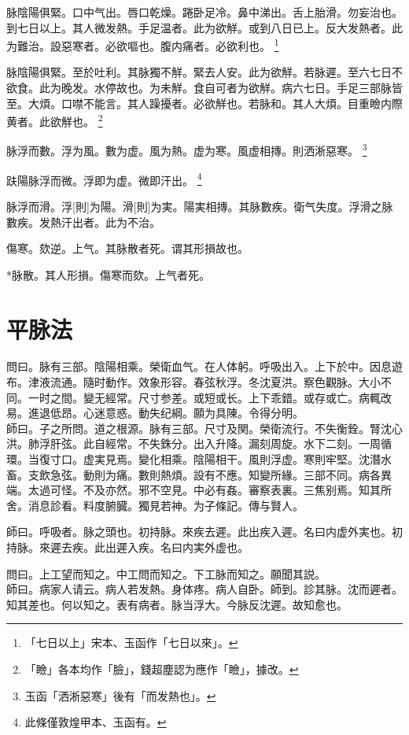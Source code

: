 \documentclass[12pt,oneside,UTF8,b5paper]{ctexbook}她她她她她她她
\begin{document}
脉陰陽俱緊。口中气出。唇口乾燥。踡卧足冷。鼻中涕出。舌上胎滑。勿妄治也。到七日以上。其人微发熱。手足温者。此为欲觧。或到八日已上。反大发熱者。此为難治。設惡寒者。必欲嘔也。腹内痛者。必欲利也。
	\footnote{「七日以上」宋本、玉函作「七日以來」。}

脉陰陽俱緊。至於吐利。其脉獨不觧。緊去人安。此为欲觧。若脉遲。至六七日不欲食。此为晚发。水停故也。为未觧。食自可者为欲觧。病六七日。手足三部脉皆至。大煩。口噤不能言。其人躁擾者。必欲觧也。若脉和。其人大煩。目重瞼内際黄者。此欲觧也。
	\footnote{「瞼」各本均作「臉」，錢超塵認为應作「瞼」，據改。}

脉浮而數。浮为風。數为虚。風为熱。虚为寒。風虚相摶。則洒淅惡寒。
	\footnote{玉函「洒淅惡寒」後有「而发熱也」。}

趺陽脉浮而微。浮即为虚。微即汗出。
	\footnote{此條僅敦煌甲本、玉函有。}

脉浮而滑。浮[則]为陽。滑[則]为実。陽実相摶。其脉數疾。衛气失度。浮滑之脉數疾。发熱汗出者。此为不治。

傷寒。欬逆。上气。其脉散者死。谓其形損故也。

*脉散。其人形損。傷寒而欬。上气者死。

\chapter{平脉法}

問曰。脉有三部。陰陽相乘。榮衛血气。在人体躬。呼吸出入。上下於中。因息遊布。津液流通。隨时動作。效象形容。春弦秋浮。冬沈夏洪。察色觀脉。大小不同。一时之間。變无經常。尺寸参差。或短或长。上下乖錯。或存或亡。病輒改易。進退低昂。心迷意惑。動失纪綱。願为具陳。令得分明。\\
師曰。子之所問。道之根源。脉有三部。尺寸及関。榮衛流行。不失衡銓。腎沈心洪。肺浮肝弦。此自經常。不失銖分。出入升降。漏刻周旋。水下二刻。一周循環。当復寸口。虚実見焉。變化相乘。陰陽相干。風則浮虚。寒則牢堅。沈潛水畜。支飲急弦。動則为痛。數則熱煩。設有不應。知變所緣。三部不同。病各異端。太過可怪。不及亦然。邪不空見。中必有姦。審察表裏。三焦别焉。知其所舍。消息診看。料度腑臓。獨見若神。为子條記。傳与賢人。

師曰。呼吸者。脉之頭也。初持脉。來疾去遲。此出疾入遲。名曰内虚外実也。初持脉。來遲去疾。此出遲入疾。名曰内実外虚也。

問曰。上工望而知之。中工問而知之。下工脉而知之。願聞其説。\\
師曰。病家人请云。病人若发熱。身体疼。病人自卧。師到。診其脉。沈而遲者。知其差也。何以知之。表有病者。脉当浮大。今脉反沈遲。故知愈也。
\end{document}
